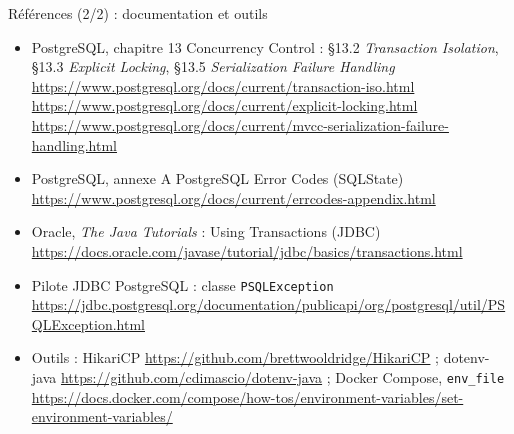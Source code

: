 \documentclass[aspectratio=169,10pt]{beamer}
\begin{document}
\begin{frame}{R\'ef\'erences (2/2) : documentation et outils}
  \footnotesize
  \begin{itemize}\setlength{\itemsep}{1.0ex}
    \item PostgreSQL, chapitre 13 \og Concurrency Control \fg{} : \S13.2 \textit{Transaction Isolation},
      \S13.3 \textit{Explicit Locking}, \S13.5 \textit{Serialization Failure Handling}\\
      \url{https://www.postgresql.org/docs/current/transaction-iso.html}\\
      \url{https://www.postgresql.org/docs/current/explicit-locking.html}\\
      \url{https://www.postgresql.org/docs/current/mvcc-serialization-failure-handling.html}
    \item PostgreSQL, annexe A \og PostgreSQL Error Codes \fg{} (SQLState)\\
      \url{https://www.postgresql.org/docs/current/errcodes-appendix.html}
    \item Oracle, \textit{The Java Tutorials} : \og Using Transactions \fg{} (JDBC)\\
      \url{https://docs.oracle.com/javase/tutorial/jdbc/basics/transactions.html}
    \item Pilote JDBC PostgreSQL : classe \texttt{PSQLException}\\
      \url{https://jdbc.postgresql.org/documentation/publicapi/org/postgresql/util/PSQLException.html}
    \item Outils : HikariCP \url{https://github.com/brettwooldridge/HikariCP} ;
      dotenv-java \url{https://github.com/cdimascio/dotenv-java} ;
      Docker Compose, \texttt{env\_file} \url{https://docs.docker.com/compose/how-tos/environment-variables/set-environment-variables/}
  \end{itemize}
\end{frame}

\rquestionslide
\end{document}
